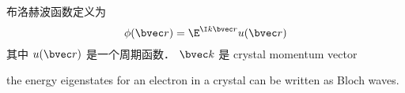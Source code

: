 

布洛赫波函数定义为
\begin{equation}
\phi(\bvec r) = \E^{\I k \bvec r} u(\bvec r)
\end{equation}
其中 $u(\bvec r)$ 是一个周期函数． $\bvec k$ 是 crystal momentum vector

the energy eigenstates for an electron in a crystal can be written as Bloch waves.
